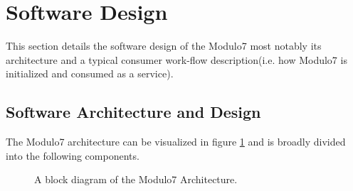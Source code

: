 \documentclass{article}
\begin{document}
\section{Software Design}\label{sec:architecture}

This section details the software design of the Modulo7 most notably its architecture and a typical consumer work-flow description(i.e. how Modulo7 is initialized and consumed as a service). 

\subsection{Software Architecture and Design}

The Modulo7 architecture can be visualized in figure \ref{fig:architecture} and is broadly divided into the following components. 

\begin{figure}[h]
\begin{center}
{}
 \caption{A block diagram of the Modulo7 Architecture.}
 \label{fig:architecture}
\end{center}
\end{figure}
\end{document}
